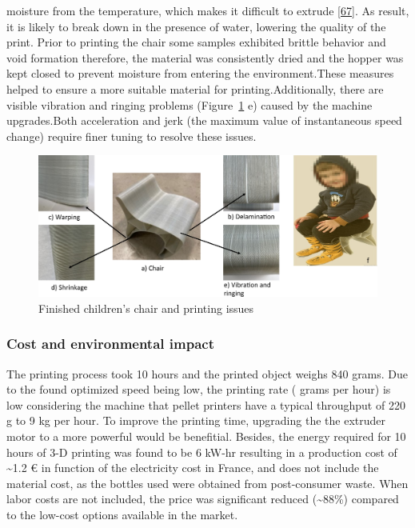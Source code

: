 \documentclass[
]{article}
\begin{document}
moisture from the temperature, which makes it difficult to extrude
\protect\hyperlink{ref-bustosseibert2022}{{[}67{]}}. As result, it is
likely to break down in the presence of water, lowering the quality of
the print. Prior to printing the chair some samples exhibited brittle
behavior and void formation therefore, the material was consistently
dried and the hopper was kept closed to prevent moisture from entering
the environment.These measures helped to ensure a more suitable material
for printing.Additionally, there are visible vibration and ringing
problems (Figure~\ref{fig-child} e) caused by the machine upgrades.Both
acceleration and jerk (the maximum value of instantaneous speed change)
require finer tuning to resolve these issues.

\begin{figure}

{\centering \includegraphics{figures/Figure6.png}

}

\caption{\label{fig-child}Finished children's chair and printing issues}

\end{figure}

\hypertarget{cost-and-environmental-impact}{%
\subsubsection{Cost and environmental
impact}\label{cost-and-environmental-impact}}

The printing process took 10 hours and the printed object weighs 840
grams. Due to the found optimized speed being low, the printing rate (
grams per hour) is low considering the machine that pellet printers have
a typical throughput of 220 g to 9 kg per hour. To improve the printing
time, upgrading the the extruder motor to a more powerful would be
benefitial. Besides, the energy required for 10 hours of 3-D printing
was found to be 6 kW-hr resulting in a production cost of
\textasciitilde1.2 € in function of the electricity cost in France, and
does not include the material cost, as the bottles used were obtained
from post-consumer waste. When labor costs are not included, the price
was significant reduced (\textasciitilde88\%) compared to the low-cost
options available in the market.
\end{document}
